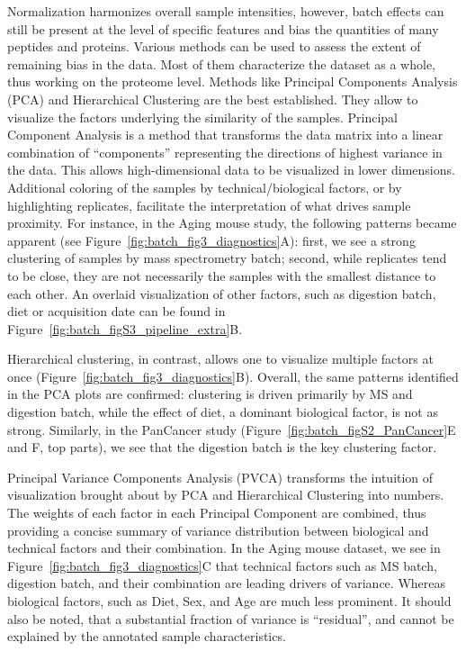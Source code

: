 \documentclass[num-refs]{wiley-article}
\begin{document}
Normalization harmonizes overall sample intensities, however, batch effects can still be present at the level of specific features and bias the quantities of many peptides and proteins.
Various methods can be used to assess the extent of remaining bias in the data. Most of them characterize the dataset as a whole, thus working on the proteome level. Methods like Principal Components Analysis (PCA) and Hierarchical Clustering are the best established. They allow to visualize the factors underlying the similarity of the samples.
Principal Component Analysis is a method that transforms the data matrix into a linear combination of “components” representing the directions of highest variance in the data. This allows high-dimensional data to be visualized in lower dimensions. Additional coloring of the samples by technical/biological factors, or by highlighting replicates, facilitate the interpretation of what drives sample proximity. For instance, in the Aging mouse study, the following patterns became apparent (see Figure~\ref{fig:batch_fig3_diagnostics}A): first, we see a strong clustering of samples by mass spectrometry batch; second, while replicates tend to be close, they are not necessarily the samples with the smallest distance to each other. An overlaid visualization of other factors, such as digestion batch, diet or acquisition date can be found in Figure~\ref{fig:batch_figS3_pipeline_extra}B. 
 
Hierarchical clustering, in contrast, allows one to visualize multiple factors at once (Figure~\ref{fig:batch_fig3_diagnostics}B). Overall, the same patterns identified in the PCA plots are confirmed: clustering is driven primarily by MS and digestion batch, while the effect of diet, a dominant biological factor, is not as strong. Similarly, in the PanCancer study (Figure~\ref{fig:batch_figS2_PanCancer}{E and F, top parts}), we see that the digestion batch is the key clustering factor.

Principal Variance Components Analysis (PVCA) transforms the intuition of visualization brought about by PCA and Hierarchical Clustering into numbers. The weights of each factor in each Principal Component are combined, thus providing a concise summary of variance distribution between biological and technical factors and their combination. In the Aging mouse dataset, we see in Figure~\ref{fig:batch_fig3_diagnostics}C that technical factors such as MS batch, digestion batch, and their combination are leading drivers of variance. Whereas biological factors, such as Diet, Sex, and Age are much less prominent. It should also be noted, that a substantial fraction of variance is “residual”, and cannot be explained by the annotated sample characteristics.
\end{document}
